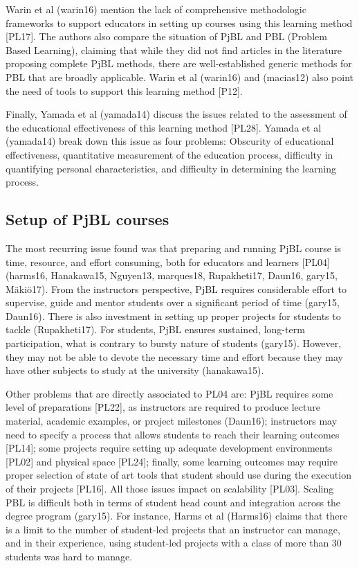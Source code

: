 Warin et al (warin16) mention the lack of comprehensive methodologic frameworks to support educators in setting up courses using this learning method [PL17].  The authors also compare the situation of PjBL and PBL (Problem Based Learning), claiming that while they did not find articles in the literature proposing complete PjBL methods, there are well-established generic methods for PBL that are broadly applicable. Warin et al (warin16) and (macias12) also point the need of tools to support this learning method [P12].

Finally, Yamada et al (yamada14) discuss the issues related to the assessment of the educational effectiveness of this learning method [PL28]. Yamada et al (yamada14) break down this issue as four problems: Obscurity of educational effectiveness, quantitative measurement of the education process, difficulty in quantifying personal characteristics, and difficulty in determining the learning process.

\subsection{Setup of PjBL courses}

The most recurring issue found was that preparing and running PjBL course is time, resource, and effort consuming, both for educators and learners [PL04] (harms16, Hanakawa15, Nguyen13, marques18, Rupakheti17, Daun16, gary15, Mäkiö17). From the instructors perspective, PjBL requires considerable effort to supervise, guide and mentor students over a significant period of time (gary15, Daun16). There is also investment in setting up proper projects for students to tackle (Rupakheti17). For students, PjBL ensures sustained, long-term participation, what is contrary to bursty nature of students (gary15). However, they may not be able to devote the necessary time and effort because they may have other subjects to study at the university (hanakawa15).

Other problems that are directly associated to PL04 are: PjBL requires some level of preparations [PL22], as instructors are required to produce lecture material, academic examples, or project milestones (Daun16); instructors may need to specify a process that allows students to reach their learning outcomes [PL14]; some projects require setting up adequate development environments [PL02]  and physical space [PL24]; finally, some learning outcomes may require proper selection of state of art tools that student should use during the execution of their projects [PL16]. 
All those issues impact on scalability [PL03]. Scaling PBL is difficult both in terms of student head count and integration across the degree program (gary15). For instance, Harms et al (Harms16) claims that there is a limit to the number of student-led projects that an instructor can manage, and in their experience, using student-led projects with a class of more than 30 students was hard to manage.

